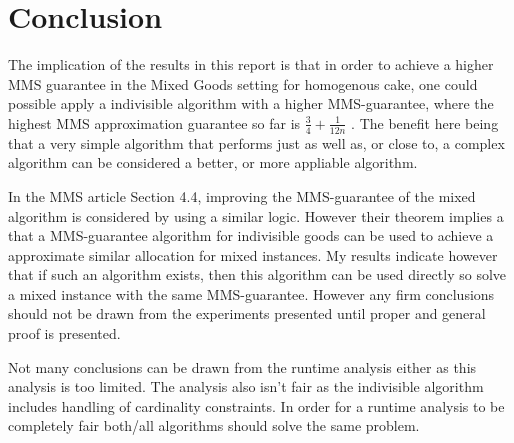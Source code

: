 \chapter{Conclusion}\label{chp:conclusion}


The implication of the results in this report is that in order to achieve a higher MMS guarantee in the Mixed Goods setting for homogenous cake, one could possible apply a indivisible algorithm with a higher MMS-guarantee, where the highest MMS approximation guarantee so far is $\frac{3}{4}+\frac{1}{12n}$ \cite{best-mms}. The benefit here being that a very simple algorithm that performs just as well as, or close to, a complex algorithm can be considered a better, or more appliable algorithm. 

In the MMS article \cite{mms} Section 4.4, improving the MMS-guarantee of the mixed algorithm is considered by using a similar logic. However their theorem implies a that a MMS-guarantee algorithm for indivisible goods can be used to achieve a approximate similar allocation for mixed instances. My results indicate however that if such an algorithm exists, then this algorithm can be used directly so solve a mixed instance with the same MMS-guarantee. However any firm conclusions should not be drawn from the experiments presented until proper and general proof is presented.

Not many conclusions can be drawn from the runtime analysis either as this analysis is too limited. The analysis also isn't fair as the indivisible algorithm\cite{Allocations} includes handling of cardinality constraints. In order for a runtime analysis to be completely fair both/all algorithms should solve the same problem.

\clearpage
